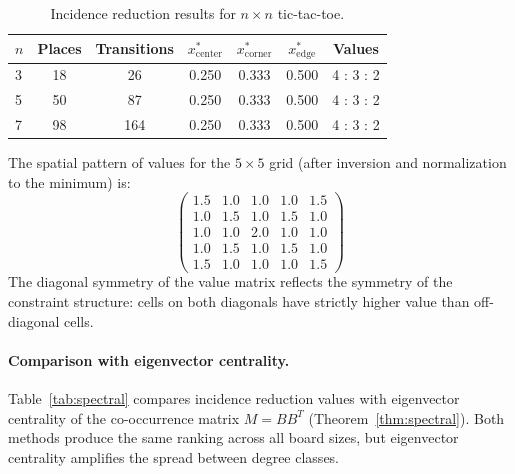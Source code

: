 \documentclass[11pt,a4paper]{article}
\begin{document}
\begin{table}[ht]
\centering
\caption{Incidence reduction results for $n \times n$ tic-tac-toe.}
\label{tab:ttt}
\begin{tabular}{@{}lcccccc@{}}
\toprule
$n$ & Places & Transitions & $x^*_{\mathrm{center}}$ & $x^*_{\mathrm{corner}}$ & $x^*_{\mathrm{edge}}$ & Values \\
\midrule
3 & 18 & 26 & 0.250 & 0.333 & 0.500 & 4 : 3 : 2 \\
5 & 50 & 87 & 0.250 & 0.333 & 0.500 & 4 : 3 : 2 \\
7 & 98 & 164 & 0.250 & 0.333 & 0.500 & 4 : 3 : 2 \\
\bottomrule
\end{tabular}
\end{table}

The spatial pattern of values for the $5 \times 5$ grid (after inversion and normalization to the minimum) is:
\[
\begin{pmatrix}
1.5 & 1.0 & 1.0 & 1.0 & 1.5 \\
1.0 & 1.5 & 1.0 & 1.5 & 1.0 \\
1.0 & 1.0 & 2.0 & 1.0 & 1.0 \\
1.0 & 1.5 & 1.0 & 1.5 & 1.0 \\
1.5 & 1.0 & 1.0 & 1.0 & 1.5
\end{pmatrix}
\]
The diagonal symmetry of the value matrix reflects the symmetry of the constraint structure: cells on both diagonals have strictly higher value than off-diagonal cells.

\paragraph{Comparison with eigenvector centrality.}
Table~\ref{tab:spectral} compares incidence reduction values with eigenvector centrality of the co-occurrence matrix $M = BB^T$ (Theorem~\ref{thm:spectral}).
Both methods produce the same ranking across all board sizes, but eigenvector centrality amplifies the spread between degree classes.
\end{document}
